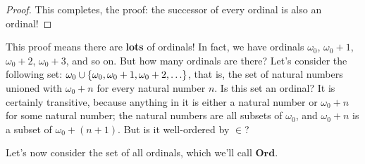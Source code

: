 \begin{proof}
    This completes, the proof: the successor of every ordinal is also an ordinal!
\end{proof}

This proof means there are \textbf{lots} of ordinals!
In fact, we have ordinals $\omega_0$, $\omega_0 + 1$, $\omega_0 + 2$, $\omega_0 + 3$, and so on.
But how many ordinals are there?
Let's consider the following set: $\omega_0 \cup {\left\{ {\omega_0, \omega_0 + 1, \omega_0 + 2, \ldots} \right\}}$, that is, the set of natural numbers unioned with $\omega_0 + n$ for every natural number $n$.
Is this set an ordinal?
It is certainly transitive, because anything in it is either a natural number or $\omega_0 + n$ for some natural number; the natural numbers are all subsets of $\omega_0$, and $\omega_0 + n$ is a subset of $\omega_0 + (n + 1)$.
But is it well-ordered by $\in$?



Let's now consider the set of all ordinals, which we'll call $\bm{Ord}$.

